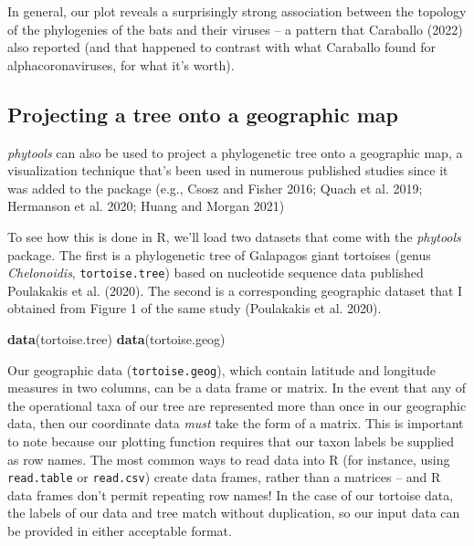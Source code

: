 \documentclass[fleqn,10pt,lineno]{wlpeerj} %
\newenvironment{Shaded}{\begin{snugshade}}{\end{snugshade}}
\newcommand{\FunctionTok}[1]{\textcolor[rgb]{0.13,0.29,0.53}{\textbf{#1}}}
\newcommand{\NormalTok}[1]{#1}
\begin{document}
In general, our plot reveals a surprisingly strong association between the topology of the phylogenies of the bats and their viruses -- a pattern that Caraballo (2022) also reported (and that happened to contrast with what Caraballo found for alphacoronaviruses, for what it's worth).

\hypertarget{projecting-a-tree-onto-a-geographic-map}{%
\subsection{Projecting a tree onto a geographic map}\label{projecting-a-tree-onto-a-geographic-map}}

\emph{phytools} can also be used to project a phylogenetic tree onto a geographic map, a visualization technique that's been used in numerous published studies since it was added to the package (e.g., Csosz and Fisher 2016; Quach et al. 2019; Hermanson et al. 2020; Huang and Morgan 2021)

To see how this is done in R, we'll load two datasets that come with the \emph{phytools} package. The first is a phylogenetic tree of Galapagos giant tortoises (genus \emph{Chelonoidis}, \texttt{tortoise.tree}) based on nucleotide sequence data published Poulakakis et al. (2020). The second is a corresponding geographic dataset that I obtained from Figure 1 of the same study (Poulakakis et al. 2020).

\begin{Shaded}
\begin{Highlighting}[]
\FunctionTok{data}\NormalTok{(tortoise.tree)}
\FunctionTok{data}\NormalTok{(tortoise.geog)}
\end{Highlighting}
\end{Shaded}

Our geographic data (\texttt{tortoise.geog}), which contain latitude and longitude measures in two columns, can be a data frame or matrix. In the event that any of the operational taxa of our tree are represented more than once in our geographic data, then our coordinate data \emph{must} take the form of a matrix. This is important to note because our plotting function requires that our taxon labels be supplied as row names. The most common ways to read data into R (for instance, using \texttt{read.table} or \texttt{read.csv}) create data frames, rather than a matrices -- and R data frames don't permit repeating row names! In the case of our tortoise data, the labels of our data and tree match without duplication, so our input data can be provided in either acceptable format.
\end{document}
